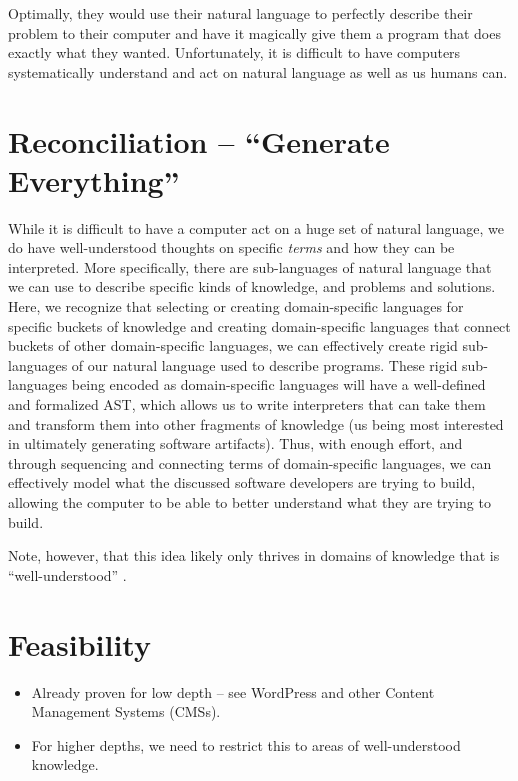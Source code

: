 Optimally, they would use their natural language to perfectly describe their
problem to their computer and have it magically give them a program that does
exactly what they wanted. Unfortunately, it is difficult to have computers
systematically understand and act on natural language as well as us humans can.

\section{Reconciliation -- ``Generate Everything''}

While it is difficult to have a computer act on a huge set of natural language,
we do have well-understood thoughts on specific \textit{terms} and how they can
be interpreted. More specifically, there are sub-languages of natural language
that we can use to describe specific kinds of knowledge, and problems and
solutions. Here, we recognize that selecting or creating domain-specific
languages for specific buckets of knowledge and creating domain-specific
languages that connect buckets of other domain-specific languages, we can
effectively create rigid sub-languages of our natural language used to describe
programs. These rigid sub-languages being encoded as domain-specific languages
will have a well-defined and formalized AST, which allows us
to write interpreters that can take them and transform them into other fragments
of knowledge (us being most interested in ultimately generating software
artifacts). Thus, with enough effort, and through sequencing and connecting
terms of domain-specific languages, we can effectively model what the discussed
software developers are trying to build, allowing the computer to be able to
better understand what they are trying to build.

Note, however, that this idea likely only thrives in domains of knowledge that
is ``well-understood'' \cite{well-understood}.

\section{Feasibility}

\begin{itemize}

    \item Already proven for low depth -- see WordPress and other Content
          Management Systems (CMSs).

    \item For higher depths, we need to restrict this to areas of
          well-understood knowledge.

\end{itemize}

